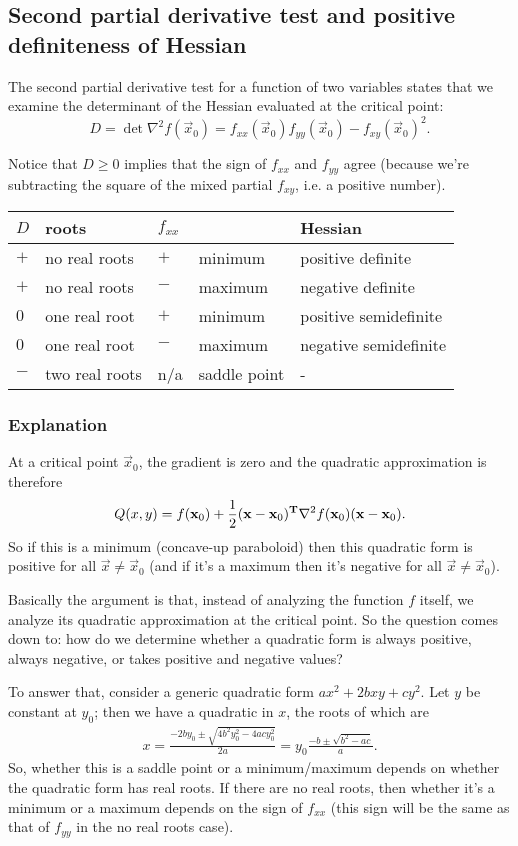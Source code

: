 \subsection{Second partial derivative test and positive definiteness of Hessian}

The second partial derivative test for a function of two variables states that
we examine the determinant of the Hessian evaluated at the critical point:
$$
D = \det \nabla^2 f(\vec x_0) = f_{xx}(\vec x_0)f_{yy}(\vec x_0) - f_{xy}(\vec x_0)^2.
$$

Notice that $D \geq 0$ implies that the sign of $f_{xx}$ and $f_{yy}$ agree
(because we're subtracting the square of the mixed partial $f_{xy}$, i.e. a
positive number).

\begin{tabular}{ l l l l l }
  $D$    & roots          & $f_{xx}$ &  & Hessian \\
  \hline
  $+$    & no real roots  & $+$     & minimum        & positive definite \\
  $+$    & no real roots  & $-$     & maximum        & negative definite \\
  $0$    & one real root  & $+$     & minimum        & positive semidefinite \\
  $0$    & one real root  & $-$     & maximum        & negative semidefinite \\
  $-$    & two real roots & n/a     & saddle point   & - \\
\end{tabular}

\subsubsection*{Explanation}
At a critical point $\vec x_0$, the gradient is zero and the quadratic approximation is therefore
$$
Q(x, y) = f(\mathbf x_0) + \frac{1}{2}(\mathbf x - \mathbf x_0)^{\mathbf{T}} \nabla^2 f(\mathbf x_0)(\mathbf x - \mathbf x_0).
$$
So if this is a minimum (concave-up paraboloid) then this quadratic form is
positive for all $\vec x \neq \vec x_0$ (and if it's a maximum then it's
negative for all $\vec x \neq \vec x_0$).

Basically the argument is that, instead of analyzing the function $f$ itself,
we analyze its quadratic approximation at the critical point. So the question
comes down to: how do we determine whether a quadratic form is always positive,
always negative, or takes positive and negative values?

To answer that, consider a generic quadratic form $ax^2 + 2bxy + cy^2$. Let $y$
be constant at $y_0$; then we have a quadratic in $x$, the roots of which are
\begin{align*}
  x
  = \frac{-2by_0 \pm \sqrt{4b^2y_0^2 - 4acy_0^2}}{2a}
  = y_0\frac{-b \pm \sqrt{b^2 - ac}}{a}.
\end{align*}
So, whether this is a saddle point or a minimum/maximum depends on whether the
quadratic form has real roots. If there are no real roots, then whether it's a
minimum or a maximum depends on the sign of $f_{xx}$ (this sign will be the
same as that of $f_{yy}$ in the no real roots case).

